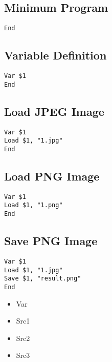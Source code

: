 \documentclass{jsbook}
\begin{document}
\subsection{Minimum Program}

\begin{verbatim}
End
\end{verbatim}


\subsection{Variable Definition}

\begin{verbatim}
Var $1
End
\end{verbatim}

\subsection{Load JPEG Image}

\begin{verbatim}
Var $1
Load $1, "1.jpg"
End
\end{verbatim}

\subsection{Load PNG Image}

\begin{verbatim}
Var $1
Load $1, "1.png"
End
\end{verbatim}

\subsection{Save PNG Image}

\begin{verbatim}
Var $1
Load $1, "1.jpg"
Save $1, "result.png"
End
\end{verbatim}


\begin{itemize}
	\item{Var}
	\item{Src1}
	\item{Src2}
	\item{Src3}
\end{itemize}
\end{document}
